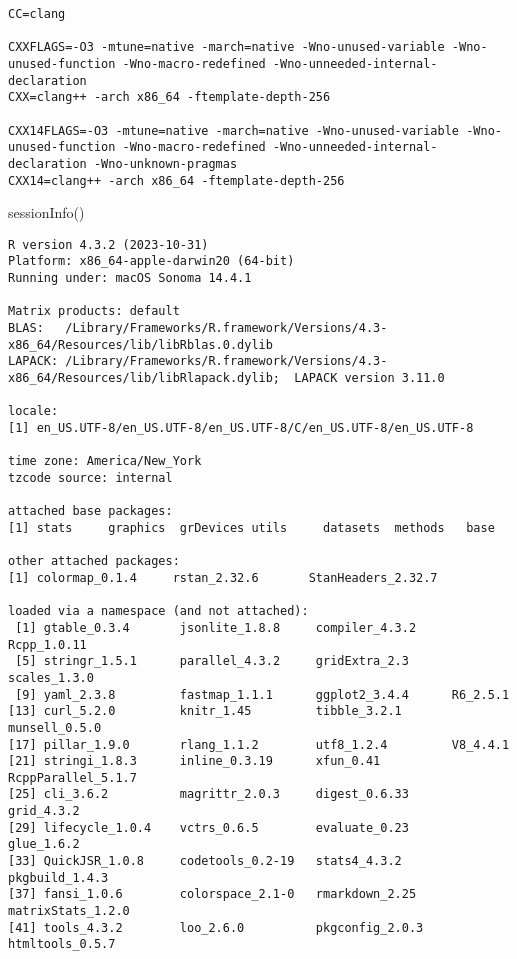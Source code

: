 \documentclass[
  letterpaper,
  DIV=11,
  numbers=noendperiod]{scrartcl}
\newenvironment{Shaded}{\begin{snugshade}}{\end{snugshade}}
\newcommand{\FunctionTok}[1]{\textcolor[rgb]{0.28,0.35,0.67}{#1}}
\newcommand{\NormalTok}[1]{\textcolor[rgb]{0.00,0.23,0.31}{#1}}
\begin{document}
\begin{verbatim}
CC=clang

CXXFLAGS=-O3 -mtune=native -march=native -Wno-unused-variable -Wno-unused-function -Wno-macro-redefined -Wno-unneeded-internal-declaration
CXX=clang++ -arch x86_64 -ftemplate-depth-256

CXX14FLAGS=-O3 -mtune=native -march=native -Wno-unused-variable -Wno-unused-function -Wno-macro-redefined -Wno-unneeded-internal-declaration -Wno-unknown-pragmas
CXX14=clang++ -arch x86_64 -ftemplate-depth-256
\end{verbatim}

\begin{Shaded}
\begin{Highlighting}[]
\FunctionTok{sessionInfo}\NormalTok{()}
\end{Highlighting}
\end{Shaded}

\begin{verbatim}
R version 4.3.2 (2023-10-31)
Platform: x86_64-apple-darwin20 (64-bit)
Running under: macOS Sonoma 14.4.1

Matrix products: default
BLAS:   /Library/Frameworks/R.framework/Versions/4.3-x86_64/Resources/lib/libRblas.0.dylib 
LAPACK: /Library/Frameworks/R.framework/Versions/4.3-x86_64/Resources/lib/libRlapack.dylib;  LAPACK version 3.11.0

locale:
[1] en_US.UTF-8/en_US.UTF-8/en_US.UTF-8/C/en_US.UTF-8/en_US.UTF-8

time zone: America/New_York
tzcode source: internal

attached base packages:
[1] stats     graphics  grDevices utils     datasets  methods   base     

other attached packages:
[1] colormap_0.1.4     rstan_2.32.6       StanHeaders_2.32.7

loaded via a namespace (and not attached):
 [1] gtable_0.3.4       jsonlite_1.8.8     compiler_4.3.2     Rcpp_1.0.11       
 [5] stringr_1.5.1      parallel_4.3.2     gridExtra_2.3      scales_1.3.0      
 [9] yaml_2.3.8         fastmap_1.1.1      ggplot2_3.4.4      R6_2.5.1          
[13] curl_5.2.0         knitr_1.45         tibble_3.2.1       munsell_0.5.0     
[17] pillar_1.9.0       rlang_1.1.2        utf8_1.2.4         V8_4.4.1          
[21] stringi_1.8.3      inline_0.3.19      xfun_0.41          RcppParallel_5.1.7
[25] cli_3.6.2          magrittr_2.0.3     digest_0.6.33      grid_4.3.2        
[29] lifecycle_1.0.4    vctrs_0.6.5        evaluate_0.23      glue_1.6.2        
[33] QuickJSR_1.0.8     codetools_0.2-19   stats4_4.3.2       pkgbuild_1.4.3    
[37] fansi_1.0.6        colorspace_2.1-0   rmarkdown_2.25     matrixStats_1.2.0 
[41] tools_4.3.2        loo_2.6.0          pkgconfig_2.0.3    htmltools_0.5.7   
\end{verbatim}
\end{document}
